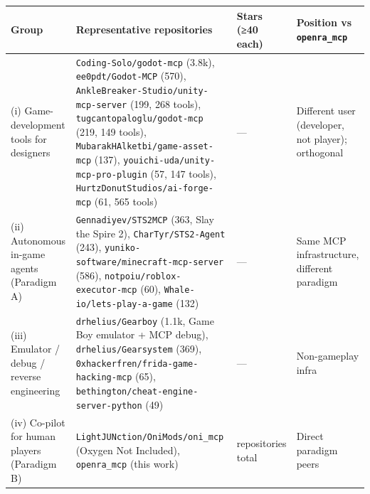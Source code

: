 \documentclass[
  journal]{IEEEtran}
\begin{document}
\begin{longtable}[]{@{}
  >{\raggedright\arraybackslash}p{}
  >{\raggedright\arraybackslash}p{}
  >{\raggedleft\arraybackslash}p{}
  >{\raggedright\arraybackslash}p{}@{}}
\toprule\noalign{}
\begin{minipage}[b]{\linewidth}\raggedright
Group
\end{minipage} & \begin{minipage}[b]{\linewidth}\raggedright
Representative repositories
\end{minipage} & \begin{minipage}[b]{\linewidth}\raggedleft
Stars (≥40 each)
\end{minipage} & \begin{minipage}[b]{\linewidth}\raggedright
Position vs \texttt{openra\_mcp}
\end{minipage} \\
\midrule\noalign{}
\endhead
\bottomrule\noalign{}
\endlastfoot
(i) Game-development tools for designers &
\texttt{Coding-Solo/godot-mcp} (3.8k), \texttt{ee0pdt/Godot-MCP} (570),
\texttt{AnkleBreaker-Studio/unity-mcp-server} (199, 268 tools),
\texttt{tugcantopaloglu/godot-mcp} (219, 149 tools),
\texttt{MubarakHAlketbi/game-asset-mcp} (137),
\texttt{youichi-uda/unity-mcp-pro-plugin} (57, 147 tools),
\texttt{HurtzDonutStudios/ai-forge-mcp} (61, 565 tools) & --- &
Different user (developer, not player); orthogonal \\
(ii) Autonomous in-game agents (Paradigm A) &
\texttt{Gennadiyev/STS2MCP} (363, Slay the Spire 2),
\texttt{CharTyr/STS2-Agent} (243),
\texttt{yuniko-software/minecraft-mcp-server} (586),
\texttt{notpoiu/roblox-executor-mcp} (60),
\texttt{Whale-io/lets-play-a-game} (132) & --- & Same MCP
infrastructure, different paradigm \\
(iii) Emulator / debug / reverse engineering & \texttt{drhelius/Gearboy}
(1.1k, Game Boy emulator + MCP debug), \texttt{drhelius/Gearsystem}
(369), \texttt{0xhackerfren/frida-game-hacking-mcp} (65),
\texttt{bethington/cheat-engine-server-python} (49) & --- & Non-gameplay
infra \\
(iv) Co-pilot for human players (Paradigm B) &
\texttt{LightJUNction/OniMods/oni\_mcp} (Oxygen Not Included),
\texttt{openra\_mcp} (this work) & 2 repositories total & Direct
paradigm peers \\
\end{longtable}
\end{document}
